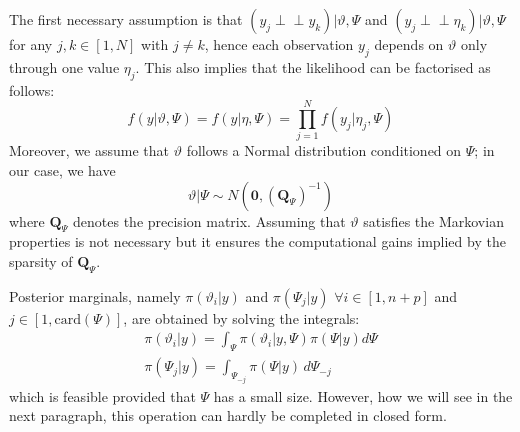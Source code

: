 \documentclass[openany]{book}
\begin{document}

The first necessary assumption is that $(y_j\perp\!\!\!\perp y_k )|\vartheta, \Psi$ and $(y_j\perp\!\!\!\perp \eta_k )|\vartheta, \Psi$ for any $j,k \in [1, N]$ with $j \neq k$, hence each observation $y_j$ depends on $\vartheta$ only through one value $\eta_j$. This also implies that the likelihood can be factorised as follows:
$$
f(y|\vartheta, \Psi) = f(y| \eta, \Psi) = \prod_{j = 1}^N f(y_j | \eta_j, \Psi)
$$
Moreover, we assume that $\vartheta$ follows a Normal distribution conditioned on $\Psi$; in our case, we have 
$$
\vartheta | \Psi \sim N(\mathbf{0}, (\mathbf{Q}_{\Psi})^{-1})
$$
where $\mathbf{Q}_{\Psi}$ denotes the precision matrix. Assuming that $\vartheta$ satisfies the Markovian properties is not necessary but it ensures the computational gains implied by the sparsity of $\mathbf{Q}_{\Psi}$.




Posterior marginals, namely $\pi(\vartheta_i | y)$ and $\pi(\Psi_j | y)$  $\forall i \in [1, n+p]$ and $j \in [1, \mathrm{card}(\Psi)]$, are obtained by solving the integrals:
 \begin{equation}
 \label{eq:marginals}
 \begin{aligned}
 \pi(\vartheta_i | y) = \int_{\Psi} \pi(\vartheta_i | y, \Psi) \pi(\Psi | y) d \Psi\\
 \pi(\Psi_j|y) = \int_{\Psi_{-j}} \pi(\Psi | y) \, d\Psi_{-j}
 \end{aligned}
 \end{equation}
which is feasible provided that $\Psi$ has a small size. However, how we will see in the next paragraph, this operation can hardly be completed in closed form.
\end{document}
